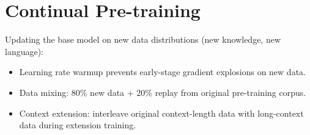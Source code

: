 \section{Continual Pre-training}

Updating the base model on new data distributions (new knowledge, new language):
\begin{itemize}
  \item Learning rate warmup prevents early-stage gradient explosions on new data.
  \item Data mixing: 80\% new data + 20\% replay from original pre-training corpus.
  \item Context extension: interleave original context-length data with long-context data during extension training.
\end{itemize}
